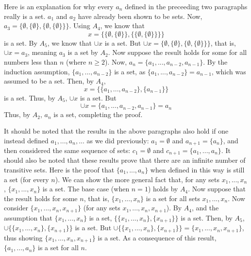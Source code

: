 \documentclass{article}
\theoremstyle{definition}
\begin{document}
Here is an explanation for why every $a_n$ defined in the preceeding two paragraphs really is a set. $a_1$ and $a_2$ have already been shown to be sets. Now, 
$a_3=\{\emptyset,\{\emptyset\},\{\emptyset,\{\emptyset\}\}\}$. Using $A_4$, we know that
\[ x=\{\{\emptyset,\{\emptyset\}\},\{\{\emptyset,\{\emptyset\}\}\}\} \] is a set. By $A_5$, we know that 
$\cup x$ is a set. But $\cup x=\{\emptyset,\{\emptyset\},\{\emptyset,\{\emptyset\}\}\}$, that is, $\cup x=a_3$, meaning $a_3$ is a set by $A_2$. Now suppose the result holds 
for some for all numbers less than $n$ (where $n\ge 2$). Now, $a_n=\{a_1,...,a_{n-2},a_{n-1}\}$. By the induction assumption, 
$\{a_1,...,a_{n-2}\}$ is a set, as $\{a_1,...,a_{n-2}\}=a_{n-1}$, which was assumed to be a set. Then, by $A_4$,
\[ x=\{\{a_1,...,a_{n-2}\},\{a_{n-1}\}\} \] is a set. Thus, by $A_5$, $\cup x$ is a set. But 
\[ \cup x=\{a_1,...,a_{n-2},a_{n-1}\}=a_n \] Thus, by $A_2$, $a_n$ is a set, completing the proof.


It should be noted that the results in the above paragraphs also hold if one instead defined $a_1,...,a_n,...$ as we did previously: $a_1=\emptyset$ and $a_{n+1}=\{a_n\}$, and then 
considered the same sequence of sets: $c_1=\emptyset$ and $c_{n+1}=\{a_1,...,a_n\}$. It should also be 
noted that these results prove that there are an infinite number of transitive sets. Here is the proof that $\{a_1,...,a_n\}$ when defined in this way is still a set (for every $n$). We can show the 
more general fact that, for any sets $x_1,...,x_n$, $\{x_1,...,x_n\}$ is a set. The base case (when $n=1$) holds by $A_4$. Now suppose that the result holds for some $n$, that is, 
$\{x_1,...,x_n\}$ is a set for all sets $x_1,...,x_n$. Now consider $\{x_1,...,x_n,x_{n+1}\}$ (for any sets $x_1,...,x_n,x_{n+1}$). By $A_4$, and the assumption that 
$\{x_1,...,x_n\}$ is a set, $\{\{x_1,...,x_n\},\{x_{n+1}\}\}$ is a set. Then, by $A_5$, $\cup\{\{x_1,...,x_n\},\{x_{n+1}\}\}$ is a set. But 
$\cup\{\{x_1,...,x_n\},\{x_{n+1}\}\}=\{x_1,...,x_n,x_{n+1}\}$, thus showing $\{x_1,...,x_n,x_{n+1}\}$ is a set. As a consequence of this result, 
$\{a_1,...,a_n\}$ is a set for all $n$. 
\end{document}
